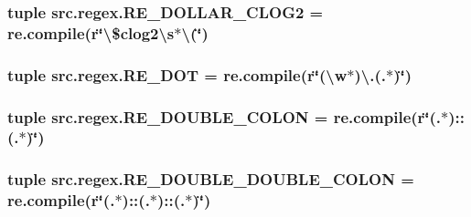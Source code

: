 \hypertarget{namespacesrc_1_1regex_a0d92469a9be615d803d8fef785bde13f}{
\subsubsection[{R\-E\-\_\-\-D\-O\-L\-L\-A\-R\-\_\-\-C\-L\-O\-G2}]{\setlength{\rightskip}{0pt plus 5cm}tuple src.\-regex.\-R\-E\-\_\-\-D\-O\-L\-L\-A\-R\-\_\-\-C\-L\-O\-G2 = re.\-compile(r\char`\"{}\textbackslash{}\$clog2\textbackslash{}s$\ast$\textbackslash{}(\char`\"{})}}\label{namespacesrc_1_1regex_a0d92469a9be615d803d8fef785bde13f}
\hypertarget{namespacesrc_1_1regex_aade96c8d59bf34d132098ae30a6f62dd}{
\subsubsection[{R\-E\-\_\-\-D\-O\-T}]{\setlength{\rightskip}{0pt plus 5cm}tuple src.\-regex.\-R\-E\-\_\-\-D\-O\-T = re.\-compile(r\char`\"{}(\textbackslash{}w$\ast$)\textbackslash{}.(.$\ast$)\char`\"{})}}\label{namespacesrc_1_1regex_aade96c8d59bf34d132098ae30a6f62dd}
\hypertarget{namespacesrc_1_1regex_a5f007b56ca09ea55d7c68559c16b21dc}{
\subsubsection[{R\-E\-\_\-\-D\-O\-U\-B\-L\-E\-\_\-\-C\-O\-L\-O\-N}]{\setlength{\rightskip}{0pt plus 5cm}tuple src.\-regex.\-R\-E\-\_\-\-D\-O\-U\-B\-L\-E\-\_\-\-C\-O\-L\-O\-N = re.\-compile(r\char`\"{}(.$\ast$)\-::(.$\ast$)\char`\"{})}}\label{namespacesrc_1_1regex_a5f007b56ca09ea55d7c68559c16b21dc}
\hypertarget{namespacesrc_1_1regex_aedd842d031aea4fe0739ceaccc4d38bd}{
\subsubsection[{R\-E\-\_\-\-D\-O\-U\-B\-L\-E\-\_\-\-D\-O\-U\-B\-L\-E\-\_\-\-C\-O\-L\-O\-N}]{\setlength{\rightskip}{0pt plus 5cm}tuple src.\-regex.\-R\-E\-\_\-\-D\-O\-U\-B\-L\-E\-\_\-\-D\-O\-U\-B\-L\-E\-\_\-\-C\-O\-L\-O\-N = re.\-compile(r\char`\"{}(.$\ast$)\-::(.$\ast$)\-::(.$\ast$)\char`\"{})}}\label{namespacesrc_1_1regex_aedd842d031aea4fe0739ceaccc4d38bd}

